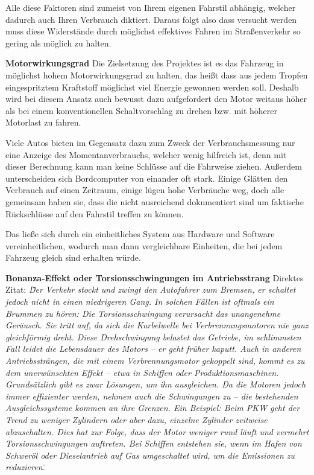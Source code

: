 Alle diese Faktoren sind zumeist von Ihrem eigenen Fahrstil abhängig, welcher dadurch auch Ihren Verbrauch diktiert. Daraus folgt also dass versucht werden muss diese Widerstände durch möglichst effektives Fahren im Straßenverkehr so gering als möglich zu halten.

\textbf{Motorwirkungsgrad\nextline}
Die Zielsetzung des Projektes ist es das Fahrzeug in möglichst hohem Motorwirkungsgrad zu halten, das heißt dass aus jedem Tropfen eingespritztem Kraftstoff möglichst viel Energie gewonnen werden soll. Deshalb wird bei diesem Ansatz auch bewusst dazu aufgefordert den Motor weitaus höher als bei einem konventionellen Schaltvorschlag zu drehen bzw. mit höherer Motorlast zu fahren.
 
Viele Autos bieten im Gegensatz dazu zum Zweck der Verbrauchsmessung nur eine Anzeige des Momentanverbrauchs, welcher wenig hilfreich ist, denn mit dieser Berechnung kann man keine Schlüsse auf die Fahrweise ziehen. Außerdem unterscheiden sich Bordcomputer von einander oft stark. Einige Glätten den Verbrauch auf einen Zeitraum, einige lügen hohe Verbräuche weg, doch alle gemeinsam haben sie, dass die nicht ausreichend dokumentiert sind um faktische Rückschlüsse auf den Fahrstil treffen zu können.

Das ließe sich durch ein einheitliches System aus Hardware und Software vereinheitlichen, wodurch man dann vergleichbare Einheiten, die bei jedem Fahrzeug gleich sind erhalten würde. 

\textbf{Bonanza-Effekt oder Torsionsschwingungen im Antriebsstrang\nextline}
Direktes Zitat: \cite{SIMR.CH2-motorwirkungsgrad.Motorschwingungen}
\textit{
\"Der Verkehr stockt und zwingt den Autofahrer zum Bremsen, er schaltet jedoch nicht in einen niedrigeren Gang. In solchen Fällen ist oftmals ein Brummen zu hören: Die Torsionsschwingung verursacht das unangenehme Geräusch. Sie tritt auf, da sich die Kurbelwelle bei Verbrennungsmotoren nie ganz gleichförmig dreht. Diese Drehschwingung belastet das Getriebe, im schlimmsten Fall leidet die Lebensdauer des Motors – er geht früher kaputt. Auch in anderen Antriebssträngen, die mit einem Verbrennungsmotor gekoppelt sind, kommt es zu dem unerwünschten Effekt – etwa in Schiffen oder Produktionsmaschinen. Grundsätzlich gibt es zwar Lösungen, um ihn ausgleichen. Da die Motoren jedoch immer effizienter werden, nehmen auch die Schwingungen zu – die bestehenden Ausgleichssysteme kommen an ihre Grenzen. Ein Beispiel: Beim PKW geht der Trend zu weniger Zylindern oder aber dazu, einzelne Zylinder zeitweise abzuschalten. Dies hat zur Folge, dass der Motor weniger rund läuft und vermehrt Torsionsschwingungen auftreten. Bei Schiffen entstehen sie, wenn im Hafen von Schweröl oder Dieselantrieb auf Gas umgeschaltet wird, um die Emissionen zu reduzieren.\"}

